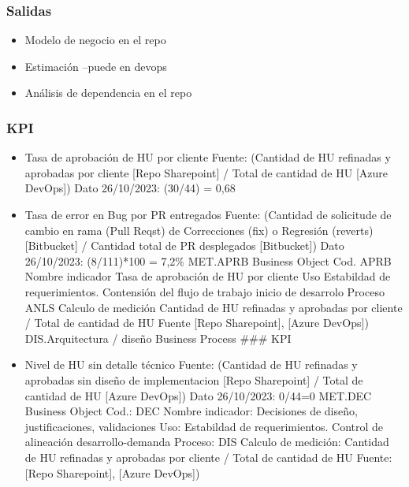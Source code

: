 \documentclass[
  paper=a4,
  ,captions=tableheading
]{scrartcl}
\providecommand{\tightlist}{%
  \setlength{\itemsep}{0pt}\setlength{\parskip}{0pt}}
\begin{document}
\subsubsection{Salidas}\label{sec:salidas-1}

\begin{itemize}
\tightlist
\item
  Modelo de negocio en el repo
\item
  Estimación --puede en devops
\item
  Análisis de dependencia en el repo
\end{itemize}

\subsubsection{KPI}\label{sec:kpi-1}

\begin{itemize}
\item
  Tasa de aprobación de HU por cliente Fuente: (Cantidad de HU refinadas
  y aprobadas por cliente {[}Repo Sharepoint{]} / Total de cantidad de
  HU {[}Azure DevOps{]}) Dato 26/10/2023: (30/44) = 0,68
\item
  Tasa de error en Bug por PR entregados Fuente: (Cantidad de solicitude
  de cambio en rama (Pull Reqst) de Correcciones (fix) o Regresión
  (reverts) {[}Bitbucket{]} / Cantidad total de PR desplegados
  {[}Bitbucket{]}) Dato 26/10/2023: (8/111)*100 = 7,2\% \textbar{}
  \textbar{} MET.APRB \textbar{} Business Object \textbar{} Cod. APRB
  Nombre indicador Tasa de aprobación de HU por cliente Uso Estabildad
  de requerimientos. Contensión del flujo de trabajo inicio de desarrolo
  Proceso ANLS Calculo de medición Cantidad de HU refinadas y aprobadas
  por cliente / Total de cantidad de HU Fuente {[}Repo Sharepoint{]},
  {[}Azure DevOps{]}) \textbar{} \textbar{} DIS.Arquitectura / diseño
  \textbar{} Business Process \textbar{} \#\#\# KPI
\item
  Nivel de HU sin detalle técnico Fuente: (Cantidad de HU refinadas y
  aprobadas sin diseño de implementacion {[}Repo Sharepoint{]} / Total
  de cantidad de HU {[}Azure DevOps{]}) Dato 26/10/2023: 0/44=0
  \textbar{} \textbar{} MET.DEC \textbar{} Business Object \textbar{}
  Cod.: DEC Nombre indicador: Decisiones de diseño, justificaciones,
  validaciones Uso: Estabildad de requerimientos. Control de alineación
  desarrollo-demanda Proceso: DIS Calculo de medición: Cantidad de HU
  refinadas y aprobadas por cliente / Total de cantidad de HU Fuente:
  {[}Repo Sharepoint{]}, {[}Azure DevOps{]})
\end{itemize}
\end{document}

